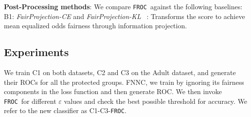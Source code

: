\documentclass{article}
\newcommand{\ouralgo}{\texttt{FROC}}
\begin{document}
        





\noindent \textbf{Post-Processing methods}: 
We compare \ouralgo\  against the following baselines: 
    B1: \emph{FairProjection-CE} and \emph{FairProjection-KL} ~\cite{alghamdi2022}: Transforms the score to achieve mean equalized odds fairness through information projection.


\subsection{Experiments} 

We train C1 on both datasets, C2 and C3 on the Adult dataset, and generate their ROCs for all the protected groups. FNNC, we train by ignoring its fairness components in the loss function and then generate ROC. We then invoke \ouralgo\ for different $\varepsilon$ values and check the best possible threshold for accuracy. We refer to the new classifier as C1-C3-\ouralgo.%
\end{document}
